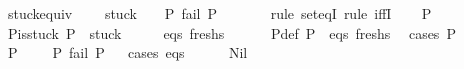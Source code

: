 \begin{isabellebody}
%
\endisatagproof
{\isafoldproof}%
%
\isadelimproof
\isanewline
%
\endisadelimproof
\isanewline
\isanewline
{}\isamarkupfalse%
\ stuck{\isacharunderscore}{\kern0pt}equiv{\isacharcolon}{\kern0pt}\ \isanewline
\ \ \ {\isachardoublequoteopen}stuck\ {\isacharequal}{\kern0pt}\ {\isacharbraceleft}{\kern0pt}{\isacharparenleft}{\kern0pt}{\isacharbrackleft}{\kern0pt}{\isacharbrackright}{\kern0pt}{\isacharcomma}{\kern0pt}{\isacharbrackleft}{\kern0pt}{\isacharbrackright}{\kern0pt}{\isacharparenright}{\kern0pt}{\isacharbraceright}{\kern0pt}\ {\isasymunion}\ {\isacharbraceleft}{\kern0pt}P{}{\isachardot}{\kern0pt}\ fail\ P{}{\isacharbraceright}{\kern0pt}{\isachardoublequoteclose}\ \ \ \ \ \ \isanewline
%
\isadelimproof
%
\endisadelimproof
%
\isatagproof
{}\isamarkupfalse%
\ {\isacharparenleft}{\kern0pt}rule\ set{\isacharunderscore}{\kern0pt}eqI{\isacharcomma}{\kern0pt}\ rule\ iffI{\isacharparenright}{\kern0pt}\isanewline
\ \ \isamarkupfalse%
\ P\isanewline
\ \ \isakeywordONE{{\isacharbraceleft}{\kern0pt}}\isamarkupfalse%
\isamarkupfalse%
\ P{\isacharunderscore}{\kern0pt}is{\isacharunderscore}{\kern0pt}stuck{\isacharcolon}{\kern0pt}\ {\isachardoublequoteopen}P\ {\isasymin}\ stuck{\isachardoublequoteclose}\isanewline
\ \ \isamarkupfalse%
\ \isamarkupfalse%
\ eqs\ freshs\ \ \isanewline
\ \ \ \ P{\isacharunderscore}{\kern0pt}def{\isacharcolon}{\kern0pt}\ {\isachardoublequoteopen}P\ {\isacharequal}{\kern0pt}\ {\isacharparenleft}{\kern0pt}eqs{\isacharcomma}{\kern0pt}\ freshs{\isacharparenright}{\kern0pt}{\isachardoublequoteclose}\ \isamarkupfalse%
\ {\isacharparenleft}{\kern0pt}cases\ P{\isacharparenright}{\kern0pt}\isanewline
\ \ \isamarkupfalse%
\ {\isachardoublequoteopen}P\ {\isasymin}\ {\isacharbraceleft}{\kern0pt}{\isacharparenleft}{\kern0pt}{\isacharbrackleft}{\kern0pt}{\isacharbrackright}{\kern0pt}{\isacharcomma}{\kern0pt}\ {\isacharbrackleft}{\kern0pt}{\isacharbrackright}{\kern0pt}{\isacharparenright}{\kern0pt}{\isacharbraceright}{\kern0pt}\ {\isasymunion}\ {\isacharbraceleft}{\kern0pt}P{}{\isachardot}{\kern0pt}\ fail\ P{}{\isacharbraceright}{\kern0pt}{\isachardoublequoteclose}\isanewline
\ \ \isamarkupfalse%
{\isacharparenleft}{\kern0pt}cases\ eqs{\isacharparenright}{\kern0pt}\isanewline
\ \ \ \ \isamarkupfalse%
\ Nil\isanewline
\ \ \ \ \isamarkupfalse%

\end{isabellebody}

